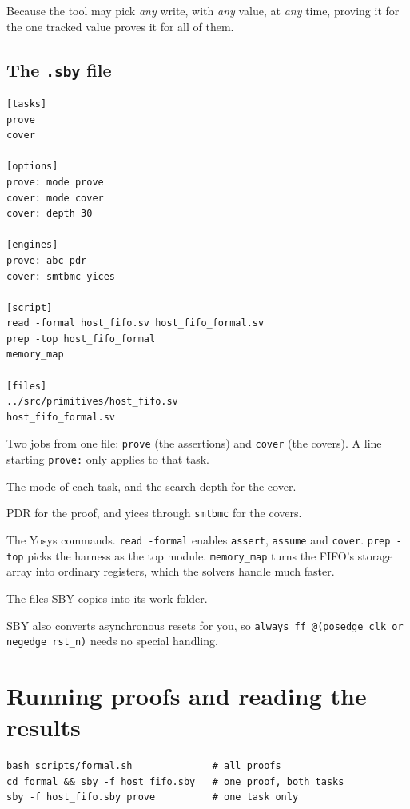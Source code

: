 \documentclass[11pt,a4paper]{article}
\newcommand{\file}[1]{\texttt{#1}}
\begin{document}
Because the tool may pick \emph{any} write, with \emph{any} value, at \emph{any} time, proving it for the one tracked value proves it for all of them.

\subsection{The \file{.sby} file}

\begin{lstlisting}
[tasks]
prove
cover

[options]
prove: mode prove
cover: mode cover
cover: depth 30

[engines]
prove: abc pdr
cover: smtbmc yices

[script]
read -formal host_fifo.sv host_fifo_formal.sv
prep -top host_fifo_formal
memory_map

[files]
../src/primitives/host_fifo.sv
host_fifo_formal.sv
\end{lstlisting}

\begin{description}[style=nextline,leftmargin=1.5em]
\item[\texttt{[tasks]}] Two jobs from one file: \texttt{prove} (the assertions) and \texttt{cover} (the covers). A line starting \texttt{prove:} only applies to that task.
\item[\texttt{[options]}] The mode of each task, and the search depth for the cover.
\item[\texttt{[engines]}] PDR for the proof, and yices through \texttt{smtbmc} for the covers.
\item[\texttt{[script]}] The Yosys commands. \texttt{read -formal} enables \texttt{assert}, \texttt{assume} and \texttt{cover}. \texttt{prep -top} picks the harness as the top module. \texttt{memory\_map} turns the FIFO's storage array into ordinary registers, which the solvers handle much faster.
\item[\texttt{[files]}] The files SBY copies into its work folder.
\end{description}

SBY also converts asynchronous resets for you, so \texttt{always\_ff @(posedge clk or negedge rst\_n)} needs no special handling.

\section{Running proofs and reading the results}

\begin{lstlisting}
bash scripts/formal.sh              # all proofs
cd formal && sby -f host_fifo.sby   # one proof, both tasks
sby -f host_fifo.sby prove          # one task only
\end{lstlisting}
\end{document}
